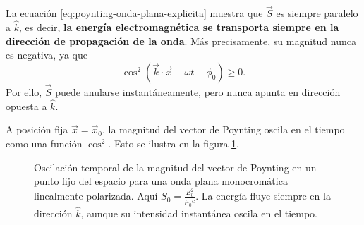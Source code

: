 \documentclass[12pt,a4paper]{article}
\theoremstyle{definition}
\theoremstyle{plain}
\numberwithin{equation}{section}
\theoremstyle{remark}
\begin{document}
La ecuación \eqref{eq:poynting-onda-plana-explicita} muestra que \(\vec S\) es siempre paralelo a \(\hat k\), es decir, \textbf{la energía electromagnética se transporta siempre en la dirección de propagación de la onda}. Más precisamente, su magnitud nunca es negativa, ya que
\begin{equation*}
    \cos^2\!\left(\vec k\cdot\vec x-\omega t+\phi_0\right)\geq 0.
\end{equation*}
Por ello, \(\vec S\) puede anularse instantáneamente, pero nunca apunta en dirección opuesta a \(\hat k\).

A posición fija \(\vec x=\vec x_0\), la magnitud del vector de Poynting oscila en el tiempo como una función \(\cos^2\). Esto se ilustra en la figura \ref{fig:poynting-cos2-tiempo}.

\begin{figure}[ht]
    \centering
    \caption{Oscilación temporal de la magnitud del vector de Poynting en un punto fijo del espacio para una onda plana monocromática linealmente polarizada. Aquí \(S_0=\frac{E_0^2}{\mu_0 c}\). La energía fluye siempre en la dirección \(\hat k\), aunque su intensidad instantánea oscila en el tiempo.}
    \label{fig:poynting-cos2-tiempo}
\end{figure}
\end{document}
